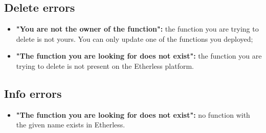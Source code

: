   \subsection{Delete errors}
  \begin{itemize}
    \item \textbf{"You are not the owner of the function":} the function you are trying to delete is not yours. You can only update one of the functions you deployed;
    \item \textbf{"The function you are looking for does not exist":} the function you are trying to delete is not present on the Etherless platform.
  \end{itemize}
  \subsection{Info errors}
  \begin{itemize}
    \item \textbf{"The function you are looking for does not exist":} no function with the given name exists in Etherless.
  \end{itemize}
